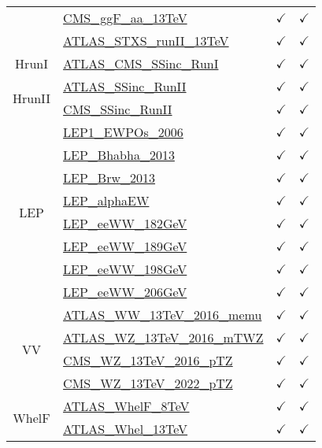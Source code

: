 \documentclass{article}
\begin{document}
\begin{longtable}{|c|l|c|c|}
 & \href{https://arxiv.org}{CMS_ggF_aa_13TeV}  & $\checkmark$ & $\checkmark$\\ \cline{2-4}
 & \href{https://arxiv.org}{ATLAS_STXS_runII_13TeV}  & $\checkmark$ & $\checkmark$
\\ \hline
\multirow{1}{*}{HrunI}
 & \href{https://arxiv.org}{ATLAS_CMS_SSinc_RunI}  & $\checkmark$ & $\checkmark$
\\ \hline
\multirow{2}{*}{HrunII}
 & \href{https://arxiv.org}{ATLAS_SSinc_RunII}  & $\checkmark$ & $\checkmark$\\ \cline{2-4}
 & \href{https://arxiv.org}{CMS_SSinc_RunII}  & $\checkmark$ & $\checkmark$
\\ \hline
\multirow{8}{*}{LEP}
 & \href{https://arxiv.org}{LEP1_EWPOs_2006}  & $\checkmark$ & $\checkmark$\\ \cline{2-4}
 & \href{https://arxiv.org}{LEP_Bhabha_2013}  & $\checkmark$ & $\checkmark$\\ \cline{2-4}
 & \href{https://arxiv.org}{LEP_Brw_2013}  & $\checkmark$ & $\checkmark$\\ \cline{2-4}
 & \href{https://arxiv.org}{LEP_alphaEW}  & $\checkmark$ & $\checkmark$\\ \cline{2-4}
 & \href{https://arxiv.org}{LEP_eeWW_182GeV}  & $\checkmark$ & $\checkmark$\\ \cline{2-4}
 & \href{https://arxiv.org}{LEP_eeWW_189GeV}  & $\checkmark$ & $\checkmark$\\ \cline{2-4}
 & \href{https://arxiv.org}{LEP_eeWW_198GeV}  & $\checkmark$ & $\checkmark$\\ \cline{2-4}
 & \href{https://arxiv.org}{LEP_eeWW_206GeV}  & $\checkmark$ & $\checkmark$
\\ \hline
\multirow{4}{*}{VV}
 & \href{https://arxiv.org}{ATLAS_WW_13TeV_2016_memu}  & $\checkmark$ & $\checkmark$\\ \cline{2-4}
 & \href{https://arxiv.org}{ATLAS_WZ_13TeV_2016_mTWZ}  & $\checkmark$ & $\checkmark$\\ \cline{2-4}
 & \href{https://arxiv.org}{CMS_WZ_13TeV_2016_pTZ}  & $\checkmark$ & $\checkmark$\\ \cline{2-4}
 & \href{https://arxiv.org}{CMS_WZ_13TeV_2022_pTZ}  & $\checkmark$ & $\checkmark$
\\ \hline
\multirow{3}{*}{WhelF}
 & \href{https://arxiv.org}{ATLAS_WhelF_8TeV}  & $\checkmark$ & $\checkmark$\\ \cline{2-4}
 & \href{https://arxiv.org}{ATLAS_Whel_13TeV}  & $\checkmark$ & $\checkmark$\\ \cline{2-4}

\end{longtable}
\end{document}
